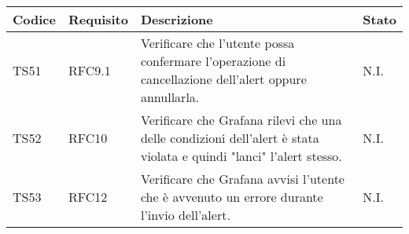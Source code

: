 \begin{table}[!htpb]
	\centering
	\renewcommand{\arraystretch}{2} 
	\begin{tabular}{|l|l|p{10cm}|l|}
		\rowcolor{orange!50}
		\hline
		\textbf{Codice} & \textbf{Requisito}& \textbf{Descrizione} & \textbf{Stato}\\ 
		\hline
		TS51 & RFC9.1 &
			Verificare che l’utente possa confermare l'operazione di cancellazione dell'alert oppure annullarla.
			& N.I.\\
		\hline
		TS52 & RFC10 &
			Verificare che Grafana rilevi che una delle condizioni dell'alert è stata violata e quindi "lanci" l'alert stesso.
			& N.I.\\
		\hline
		TS53 & RFC12 &
			Verificare che Grafana avvisi l’utente che è avvenuto un errore durante l’invio dell’alert.
			& N.I.\\
		\hline
	\end{tabular}
\end{table}
\clearpage